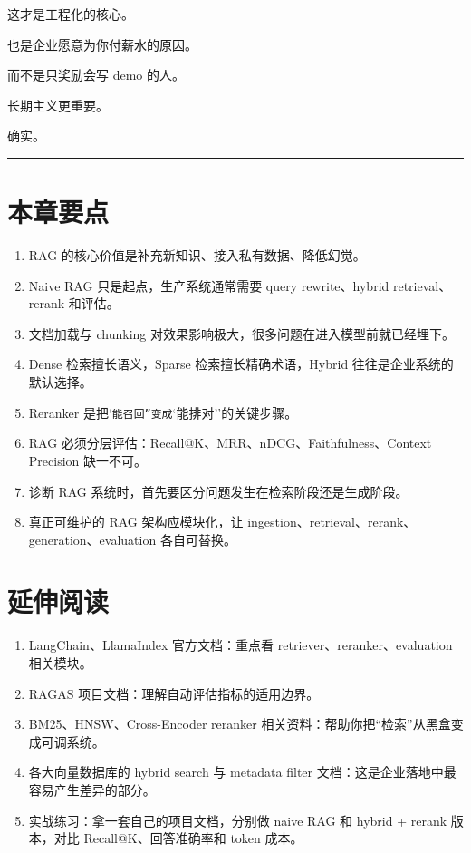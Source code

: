 这才是工程化的核心。

也是企业愿意为你付薪水的原因。

而不是只奖励会写 demo 的人。

长期主义更重要。

确实。


\bigskip\hrule\bigskip

\section{本章要点}

\begin{enumerate}[leftmargin=2em]
\item RAG 的核心价值是补充新知识、接入私有数据、降低幻觉。
\item Naive RAG 只是起点，生产系统通常需要 query rewrite、hybrid retrieval、rerank 和评估。
\item 文档加载与 chunking 对效果影响极大，很多问题在进入模型前就已经埋下。
\item Dense 检索擅长语义，Sparse 检索擅长精确术语，Hybrid 往往是企业系统的默认选择。
\item Reranker 是把`\texttt{能召回''变成}`能排对''的关键步骤。
\item RAG 必须分层评估：Recall@K、MRR、nDCG、Faithfulness、Context Precision 缺一不可。
\item 诊断 RAG 系统时，首先要区分问题发生在检索阶段还是生成阶段。
\item 真正可维护的 RAG 架构应模块化，让 ingestion、retrieval、rerank、generation、evaluation 各自可替换。
\end{enumerate}

\section{延伸阅读}

\begin{enumerate}[leftmargin=2em]
\item LangChain、LlamaIndex 官方文档：重点看 retriever、reranker、evaluation 相关模块。
\item RAGAS 项目文档：理解自动评估指标的适用边界。
\item BM25、HNSW、Cross-Encoder reranker 相关资料：帮助你把``检索''从黑盒变成可调系统。
\item 各大向量数据库的 hybrid search 与 metadata filter 文档：这是企业落地中最容易产生差异的部分。
\item 实战练习：拿一套自己的项目文档，分别做 naive RAG 和 hybrid + rerank 版本，对比 Recall@K、回答准确率和 token 成本。
\end{enumerate}
